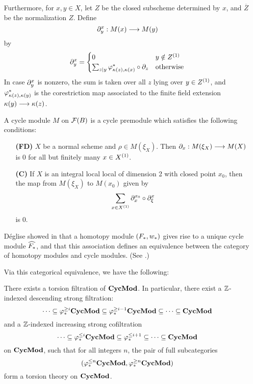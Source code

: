 Furthermore, for $x, y \in X$, let $Z$ be the closed subscheme 
determined by $x$, and $\overline{Z}$ be the normalization $Z$.
Define
\[
\ptres{x}{y}: M(x) \to M(y)
\]
by
\[
\ptres{x}{y} = 
\begin{cases}
0 & y \notin \subsch{1}{Z} \\
\sum_{z|y} \phi_{\resf{z},\resf{x}}^* \comp \res{z} & \textrm{otherwise}
\end{cases}
\]
In case $\ptres{x}{y}$ is nonzero, the sum is taken over all $z$
lying over $y \in \subsch{1}{Z}$, and
$\phi_{\resf{z},\resf{y}}^*$ is the corestriction map associated to 
the finite field extension $\resf{y} \to \resf{z}$.

\begin{defn}
A cycle module $M$ on $\fields(B)$ is a cycle premodule which
satisfies the following conditions:

\begin{enumerate}
\item[\textbf{(FD)}]  
$X$ be a normal scheme and $\rho \in M(\xi_X)$. Then $\res{x}: 
M(\xi_X) \to M(X)$ is 0 for all but finitely many $x \in 
\subsch{1}{X}$.

\item[\textbf{(C)}]  If $X$ is an integral
local local of dimension 2 with closed point $x_0$, then the map 
from $M(\xi_X)$ to $M(x_0)$ given by
\[
\sum_{x \in \subsch{1}{X}} \ptres{x_0}{x} \comp \ptres{x}{\xi}
\]
is 0.
\end{enumerate}
\end{defn}

D\'eglise showed in \cite{DegModHom} that a homotopy module $(F_*, 
\deloop_*)$ gives rise to a unique cycle module $\assocCM{F_*}$,
and that this association defines an equivalence between the 
category of homotopy modules and cycle modules. (See 
\cite[3.7]{DegModHom}.)

Via this categorical equivalence, we have the following:
\begin{thm}
There exists a torsion filtration of $\CycMod$. In particular,
there exist a $\Z$-indexed descending strong filtration:
\[
\cdots \subseteq \tgHM{i}\CycMod \subseteq \tgHM{i - 1}\CycMod \subseteq 
   \cdots \subseteq \CycMod
\]
and a $\Z$-indexed increasing strong cofiltration 
\[
\cdots \subseteq \tlHM{i}\CycMod \subseteq \tlHM{i + 1} \subseteq 
   \cdots \subseteq \CycMod
\]
on $\CycMod$, such that for all integers $n$, the pair of full 
subcategories 
\[
(\tlHM{n}\CycMod, \tgHM{n}\CycMod)
\]
form a torsion theory on $\CycMod$.
\end{thm}

